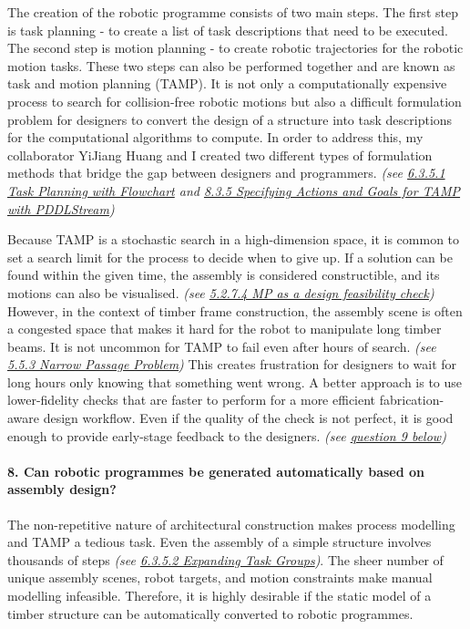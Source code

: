 The creation of the robotic programme consists of two main steps. The first step is task planning - to create a list of task descriptions that need to be executed. The second step is motion planning - to create robotic trajectories for the robotic motion tasks. These two steps can also be performed together and are known as task and motion planning (TAMP). It is not only a computationally expensive process to search for collision-free robotic motions but also a difficult formulation problem for designers to convert the design of a structure into task descriptions for the computational algorithms to compute. In order to address this, my collaborator YiJiang Huang and I created two different types of formulation methods that bridge the gap between designers and programmers. \textit{(see \ul{6.3.5.1 Task Planning with Flowchart} and \ul{8.3.5 Specifying Actions and Goals for TAMP with PDDLStream})}

Because TAMP is a stochastic search in a high-dimension space, it is common to set a search limit for the process to decide when to give up. If a solution can be found within the given time, the assembly is considered constructible, and its motions can also be visualised. \textit{(see \ul{5.2.7.4 MP as a design feasibility check})} However, in the context of timber frame construction, the assembly scene is often a congested space that makes it hard for the robot to manipulate long timber beams. It is not uncommon for TAMP to fail even after hours of search. \textit{(see \ul{5.5.3 Narrow Passage Problem}) }This creates frustration for designers to wait for long hours only knowing that something went wrong. A better approach is to use lower-fidelity checks that are faster to perform for a more efficient fabrication-aware design workflow. Even if the quality of the check is not perfect, it is good enough to provide early-stage feedback to the designers. \textit{(see \ul{question 9 below})}

\paragraph{8. Can robotic programmes be generated automatically based on assembly design?}

The non-repetitive nature of architectural construction makes process modelling and TAMP a tedious task. Even the assembly of a simple structure involves thousands of steps\textit{ (see \ul{6.3.5.2 Expanding Task Groups})}. The sheer number of unique assembly scenes, robot targets, and motion constraints make manual modelling infeasible. Therefore, it is highly desirable if the static model of a timber structure can be automatically converted to robotic programmes.

